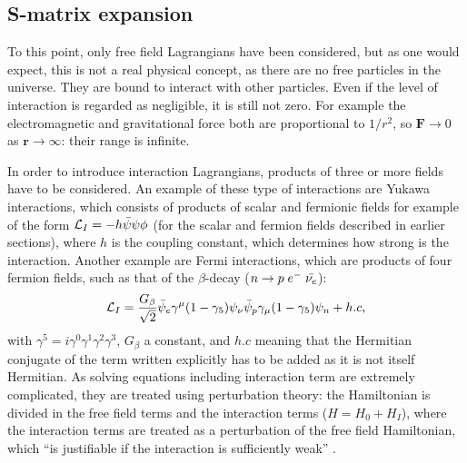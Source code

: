 
\subsection{S-matrix expansion} \label{ssec:Smatrix}

To this point, only free field Lagrangians have been considered, but as one would expect, this is not a real physical concept, as there are no free particles in the universe. They are bound to interact with other particles. Even if the level of interaction is regarded as negligible, it is still not zero. For example the electromagnetic and gravitational force both are proportional to $1/r^2$, so $\bm{F} \rightarrow 0$ as $\bm{r} \rightarrow \infty$: their range is infinite.

In order to introduce interaction Lagrangians, products of three or more fields have to be considered. An example of these type of interactions are Yukawa interactions, which consists of products of scalar and fermionic fields for example of the form $\mathcal{L}_{I} = -h\Bar{\psi}\psi\phi$ (for the scalar and fermion fields described in earlier sections), where $h$ is the coupling constant, which determines how strong is the interaction. Another example are Fermi interactions, which are products of four fermion fields, such as that of the $\beta$-decay ($n \rightarrow p \; e^- \; \Bar{\nu_e}$):
\begin{equation*}
    \mathcal{L}_{I} = \dfrac{G_{\beta}}{\sqrt{2}}\Bar{\psi}_{e}\gamma^{\mu}(1-\gamma_5)\psi_{\nu}\Bar{\psi}_{p}\gamma_{\mu}(1-\gamma_5)\psi_{n} + h.c,
\end{equation*}
with $\gamma^5 = i\gamma^0\gamma^1\gamma^2\gamma^3$, $G_{\beta}$ a constant, and $h.c$ meaning that the Hermitian conjugate of the term written explicitly has to be added as it is not itself Hermitian. As solving equations including interaction term are extremely complicated, they are treated using perturbation theory: the Hamiltonian is divided in the free field terms and the interaction terms ($H = H_0 + H_I$), where the interaction terms are treated as a perturbation of the free field Hamiltonian, which ``is justifiable if the interaction is sufficiently weak'' \cite{Lahiri}\cite{Mandl}.

